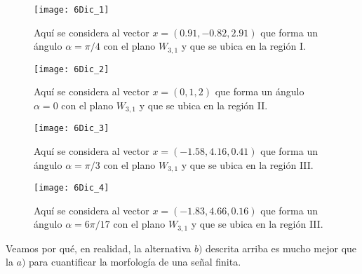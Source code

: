 \begin{ejemplo}
\begin{figure}[H]
\centering\captionsetup{format = hang}
	\begin{measuredfigure}
		\texttt{[image: 6Dic\_1]} 
		\caption{Aquí se considera al vector 
		$x=(0.91,-0.82,2.91)$ que forma un ángulo $\alpha=\pi/4$
		con el plano $W_{3,1}$ y que se ubica en la región I.}
 	\end{measuredfigure}
 \end{figure}
 
 
\begin{figure}[H]
\centering\captionsetup{format = hang}
	\begin{measuredfigure}
		\texttt{[image: 6Dic\_2]} 
		\caption{Aquí se considera al vector 
		$x=(0,1,2)$ que forma un ángulo $\alpha=0$
		con el plano $W_{3,1}$ y que se ubica en la región II.}
 	\end{measuredfigure}
 \end{figure}

\begin{figure}[H]
\centering\captionsetup{format = hang}
	\begin{measuredfigure}
		\texttt{[image: 6Dic\_3]} 
		\caption{Aquí se considera al vector
		$x=(-1.58,4.16,0.41)$ que forma un ángulo $\alpha=\pi/3$
		con el plano $W_{3,1}$ y que se ubica en la región III.}
 	\end{measuredfigure}
 \end{figure}
 
 
\begin{figure}[H]
\centering\captionsetup{format = hang}
	\begin{measuredfigure}
		\texttt{[image: 6Dic\_4]} 
		\caption{Aquí se considera al vector 
		$x=(-1.83,4.66,0.16)$ que forma un ángulo $\alpha=6\pi/17$
		con el plano $W_{3,1}$ y que se ubica en la región III.}
 	\end{measuredfigure}
 \end{figure}
 
 

Veamos por qué, en realidad, la alternativa $b)$
descrita arriba es mucho mejor que la $a)$ para cuantificar 
la morfología de una señal finita.


\final
\end{ejemplo}

